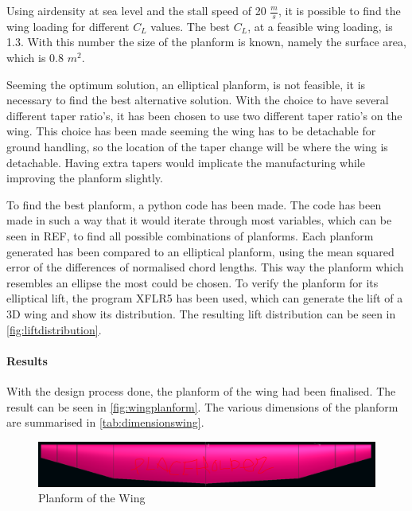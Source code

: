 Using airdensity at sea level and the stall speed of 20 $\frac{m}{s}$, it is possible to find the wing loading for different $C_{L}$ values. The best $C_{L}$, at a feasible wing loading, is 1.3. With this number the size of the planform is known, namely the surface area, which is 0.8 $m^2$.

Seeming the optimum solution, an elliptical planform, is not feasible, it is necessary to find the best alternative solution. With the choice to have several different taper ratio's, it has been chosen to use two different taper ratio's on the wing. This choice has been made seeming the wing has to be detachable for ground handling, so the location of the taper change will be where the wing is detachable. Having extra tapers would implicate the manufacturing while improving the planform slightly. 

To find the best planform, a python code has been made. The code has been made in such a way that it would iterate through most variables, which can be seen in REF, to find all possible combinations of planforms. Each planform generated has been compared to an elliptical planform, using the mean squared error of the differences of normalised chord lengths. This way the planform which resembles an ellipse the most could be chosen. To verify the planform for its elliptical lift, the program XFLR5 has been used, which can generate the lift of a 3D wing and show its distribution. The resulting lift distribution can be seen in \autoref{fig:liftdistribution}.

\paragraph{Results}

With the design process done, the planform of the wing had been finalised. The result can be seen in \autoref{fig:wingplanform}. The various dimensions of the planform are summarised in \autoref{tab:dimensionswing}.

\begin{figure}[H]
    \centering
    \includegraphics[scale=0.35]{Aerodynamics/Figures/Planform_Placeholder}
    \caption{Planform of the Wing}
    \label{fig:wingplanform}
\end{figure}

